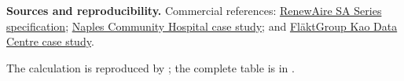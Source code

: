 \documentclass[9pt,a4paper]{article}
\begin{document}
\textbf{Sources and reproducibility.}
Commercial references:
\href{https://renewaire.com/wp-content/uploads/2025/05/Submittal-SASeries-Sept2021-1.pdf}{RenewAire SA Series specification};
\href{https://renewaire.com/casestudies/naples-community-hospital/}{Naples Community Hospital case study}; and
\href{https://www.flaktgroup.com/en/references/kao-data-center/}{FläktGroup Kao Data Centre case study}.

The calculation is reproduced by
; the complete table is in
.
\end{document}
